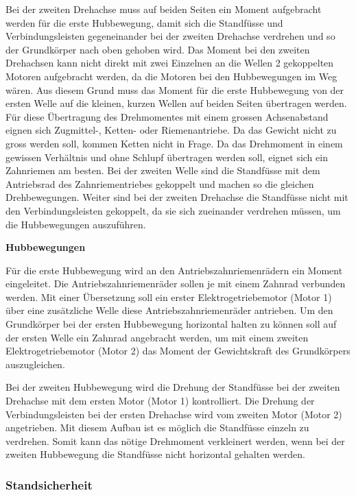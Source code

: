 Bei der zweiten Drehachse muss auf beiden Seiten ein Moment aufgebracht werden für die erste Hubbewegung, damit sich die Standfüsse und Verbindungsleisten gegeneinander bei der zweiten Drehachse verdrehen und so der Grundkörper nach oben gehoben wird. Das Moment bei den zweiten Drehachsen kann nicht direkt mit zwei Einzelnen an die Wellen 2 gekoppelten Motoren aufgebracht werden, da die Motoren bei den Hubbewegungen im Weg wären. Aus diesem Grund muss das Moment für die erste Hubbewegung von der ersten Welle auf die kleinen, kurzen Wellen auf beiden Seiten übertragen werden. Für diese Übertragung des Drehmomentes mit einem grossen Achsenabstand eignen sich Zugmittel-, Ketten- oder Riemenantriebe. Da das Gewicht nicht zu gross werden soll, kommen Ketten nicht in Frage. Da das Drehmoment in einem gewissen Verhältnis und ohne Schlupf übertragen werden soll, eignet sich ein Zahnriemen am besten. Bei der zweiten Welle sind die Standfüsse mit dem Antriebsrad des Zahnriementriebes gekoppelt und machen so die gleichen Drehbewegungen. Weiter sind bei der zweiten Drehachse die Standfüsse nicht mit den Verbindungsleisten gekoppelt, da sie sich zueinander verdrehen müssen, um die Hubbewegungen auszuführen.

\newpage

\textbf{Hubbewegungen}

Für die erste Hubbewegung wird an den Antriebszahnriemenrädern ein Moment eingeleitet. Die Antriebszahnriemenräder sollen je mit einem Zahnrad verbunden werden. Mit einer Übersetzung soll ein erster Elektrogetriebemotor (Motor 1) über eine zusätzliche Welle diese Antriebszahnriemenräder antrieben. Um den Grundkörper bei der ersten Hubbewegung horizontal halten zu können soll auf der ersten Welle ein Zahnrad angebracht werden, um mit einem zweiten Elektrogetriebemotor (Motor 2) das Moment der Gewichtskraft des Grundkörpers auszugleichen.

Bei der zweiten Hubbewegung wird die Drehung der Standfüsse bei der zweiten Drehachse mit dem ersten Motor (Motor 1) kontrolliert. Die Drehung der Verbindungsleisten bei der ersten Drehachse wird vom zweiten Motor (Motor 2) angetrieben. Mit diesem Aufbau ist es möglich die Standfüsse einzeln zu verdrehen. Somit kann das nötige Drehmoment verkleinert werden, wenn bei der zweiten Hubbewegung die Standfüsse nicht horizontal gehalten werden.






\subsubsection{Standsicherheit}


